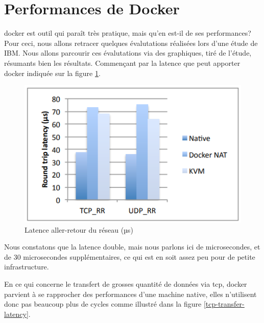 \documentclass[
    iai, %
    il, %
]{heig-tb}
\begin{document}
\section{Performances de Docker}
\Gls{docker} est outil qui paraît très pratique, mais qu'en est-il de ses performances?
Pour ceci, nous allons retracer quelques évalutations réalisées lors d'une étude de IBM. Nous allons parcourir ces évalutations via des graphiques, tiré de l'étude, résumants bien les résultats.
Commençant par la latence que peut apporter \Gls{docker} indiquée sur la figure \ref{network-latency}.

\begin{center}
    \begin{figure}
        \includegraphics[width=\textwidth]{./assets/figures/docker-perf-latency.png}
        \caption[Docker latence aller-retour du réseau]{Latence aller-retour du réseau (µs) \cite{rad2017introduction} \label{network-latency}}
    \end{figure}
\end{center}

Nous constatons que la latence double, mais nous parlons ici de microsecondes, et de 30 microsecondes supplémentaires, ce qui est en soit assez peu pour de petite infrastructure.

En ce qui concerne le transfert de grosses quantité de données via \gls{tcp}, \Gls{docker} parvient à se
rapprocher des performances d'une machine native, elles n'utilisent donc pas beaucoup plus de cycles
comme illustré dans la figure \ref{tcp-transfer-latency}.
\end{document}
